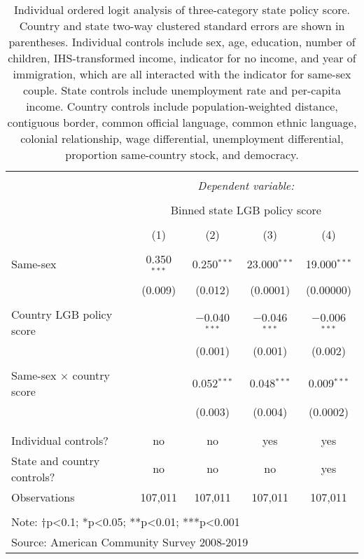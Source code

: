 \documentclass[
  11pt,
]{article}
\begin{document}
\begin{table}[!htbp] \centering 
  \caption{Individual ordered logit analysis of three-category state policy score. Country and state two-way clustered standard errors are shown in parentheses. Individual controls include sex, age, education, number of children, IHS-transformed income, indicator for no income, and year of immigration, which are all interacted with the indicator for same-sex couple. State controls include unemployment rate and per-capita income. Country controls include population-weighted distance, contiguous border, common official language, common ethnic language, colonial relationship, wage differential, unemployment differential, proportion same-country stock, and democracy.} 
  \label{tab:ord} 
\begin{tabular}{@{\extracolsep{5pt}}lcccc} 
\\[-1.8ex]\hline 
\hline \\[-1.8ex] 
 & \multicolumn{4}{c}{\textit{Dependent variable:}} \\ 
\cline{2-5} 
\\[-1.8ex] & \multicolumn{4}{c}{Binned state LGB policy score} \\ 
\\[-1.8ex] & (1) & (2) & (3) & (4)\\ 
\hline \\[-1.8ex] 
 Same-sex & 0.350$^{***}$ & 0.250$^{***}$ & 23.000$^{***}$ & 19.000$^{***}$ \\ 
  & (0.009) & (0.012) & (0.0001) & (0.00000) \\ 
  & & & & \\ 
 Country LGB policy score &  & $-$0.040$^{***}$ & $-$0.046$^{***}$ & $-$0.006$^{***}$ \\ 
  &  & (0.001) & (0.001) & (0.002) \\ 
  & & & & \\ 
 Same-sex × country score &  & 0.052$^{***}$ & 0.048$^{***}$ & 0.009$^{***}$ \\ 
  &  & (0.003) & (0.004) & (0.0002) \\ 
  & & & & \\ 
\hline \\[-1.8ex] 
Individual controls? & no & no & yes & yes \\ 
State and country controls? & no & no & no & yes \\ 
Observations & 107,011 & 107,011 & 107,011 & 107,011 \\ 
\hline 
\hline \\[-1.8ex] 
\multicolumn{5}{l}{Note: †p<0.1; *p<0.05; **p<0.01; ***p<0.001} \\ 
\multicolumn{5}{l}{Source: American Community Survey 2008-2019} \\ 
\end{tabular} 
\end{table}
\end{document}
